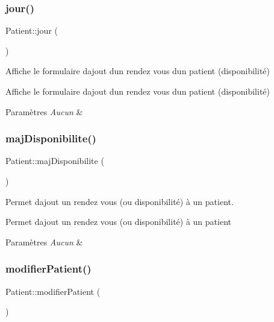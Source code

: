 \subsubsection{\texorpdfstring{jour()}{jour()}}
{\footnotesize\ttfamily Patient\+::jour (\begin{DoxyParamCaption}{ }\end{DoxyParamCaption})}



Affiche le formulaire d\textquotesingle{}ajout d\textquotesingle{}un rendez vous d\textquotesingle{}un patient (disponibilité) 

Affiche le formulaire d\textquotesingle{}ajout d\textquotesingle{}un rendez vous d\textquotesingle{}un patient (disponibilité) 
\begin{DoxyParams}{Paramètres}
{\em Aucun} & \\
\hline
\end{DoxyParams}
\mbox{\label{class_patient_a8add65878be9634fb8306905d46dc708}} 
\subsubsection{\texorpdfstring{maj\+Disponibilite()}{majDisponibilite()}}
{\footnotesize\ttfamily Patient\+::maj\+Disponibilite (\begin{DoxyParamCaption}{ }\end{DoxyParamCaption})}



Permet d\textquotesingle{}ajout un rendez vous (ou disponibilité) à un patient. 

Permet d\textquotesingle{}ajout un rendez vous (ou disponibilité) à un patient 
\begin{DoxyParams}{Paramètres}
{\em Aucun} & \\
\hline
\end{DoxyParams}
\mbox{\label{class_patient_a0452dd4c6e851e05c7e5d39e78469111}} 
\subsubsection{\texorpdfstring{modifier\+Patient()}{modifierPatient()}}
{\footnotesize\ttfamily Patient\+::modifier\+Patient (\begin{DoxyParamCaption}{ }\end{DoxyParamCaption})}



